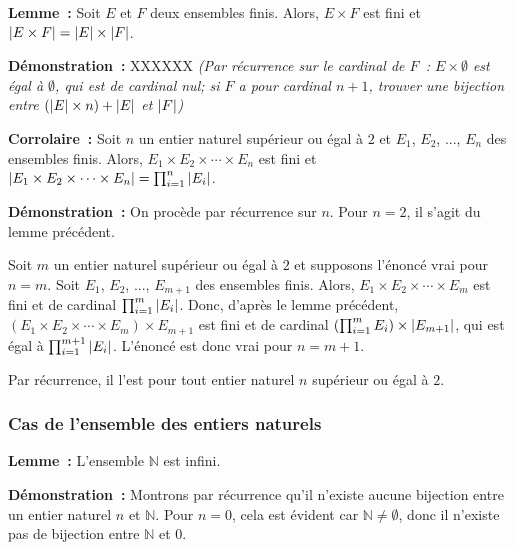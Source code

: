 \medskip

\noindent\textbf{Lemme :} Soit $E$ et $F$ deux ensembles finis.
    Alors, $E \times F$ est fini et $\left\lvert E \times F \right\rvert = \left\lvert E \right\rvert \times \left\lvert F \right\rvert$.

\medskip

\noindent\textbf{Démonstration :} XXXXXX \textit{(Par récurrence sur le cardinal de $F$ : $E \times \emptyset$ est égal à $\emptyset$, qui est de cardinal nul; si $F$ a pour cardinal $n+1$, trouver une bijection entre $(\left\lvert E \right\rvert \times n) + \left\lvert E \right\rvert$ et $\left\lvert F \right\rvert$)}

\medskip

\noindent\textbf{Corrolaire :} Soit $n$ un entier naturel supérieur ou égal à $2$ et $E_1$, $E_2$, ..., $E_n$ des ensembles finis.
    Alors, $E_1 \times E_2 \times \cdots \times E_n$ est fini et $\left\lvert E_1 \times E_2 \times \cdots \times E_n \right\rvert = \prod_{i=1}^n \left\lvert E_i \right\rvert$.

\medskip

\noindent\textbf{Démonstration :} On procède par récurrence sur $n$. 
    Pour $n = 2$, il s'agit du lemme précédent.

    Soit $m$ un entier naturel supérieur ou égal à $2$ et supposons l'énoncé vrai pour $n=m$. 
    Soit $E_1$, $E_2$, ..., $E_{m+1}$ des ensembles finis. 
    Alors, $E_1 \times E_2 \times \cdots \times E_m$ est fini et de cardinal $\prod_{i=1}^m \left\lvert E_i \right\rvert$.
    Donc, d'après le lemme précédent, $\left( E_1 \times E_2 \times \cdots \times E_m \right) \times E_{m+1}$ est fini et de cardinal $\left( \prod_{i=1}^m E_i \right) \times \left\lvert E_{m+1} \right\rvert$, qui est égal à $\prod_{i=1}^{m+1} \left\lvert E_i \right\rvert$.
    L'énoncé est donc vrai pour $n = m+1$. 

    Par récurrence, il l'est pour tout entier naturel $n$ supérieur ou égal à $2$.

    \done


\subsubsection{Cas de l'ensemble des entiers naturels}

\noindent\textbf{Lemme :} L'ensemble $\mathbb{N}$ est infini. 

\medskip

\noindent\textbf{Démonstration :} Montrons par récurrence qu'il n'existe aucune bijection entre un entier naturel $n$ et $\mathbb{N}$. 
    Pour $n=0$, cela est évident car $\mathbb{N} \neq \emptyset$, donc il n'existe pas de bijection entre $\mathbb{N}$ et $0$.
    
